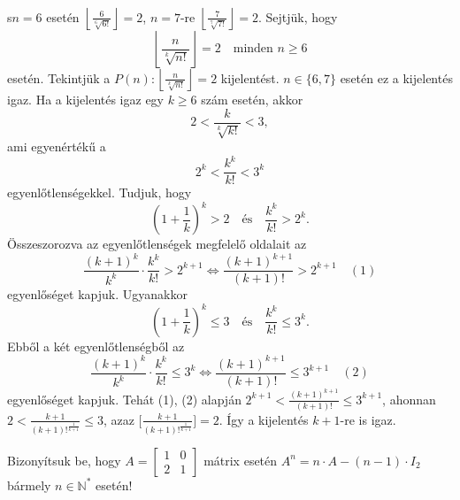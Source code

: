 \begin{solution}
s$n=6$ esetén $\left\lfloor \frac{6}{\sqrt[6]{6!}}\right\rfloor =2$,
\quad{}$n=7$-re $\left\lfloor \frac{7}{\sqrt[7]{7!}}\right\rfloor =2$.
Sejtjük, hogy 
\[
\left\lfloor \frac{n}{\sqrt[k]{n!}}\right\rfloor =2\quad\text{minden }n\geq6
\]
esetén. Tekintjük a $P(n):\left\lfloor \frac{n}{\sqrt[k]{n!}}\right\rfloor =2$
kijelentést. $n\in\{6,7\}$ esetén ez a kijelentés igaz. Ha a kijelentés
igaz egy $k\geq6$ szám esetén, akkor 
\[
2<\frac{k}{\sqrt[k]{k!}}<3,
\]
ami egyenértékű a 
\[
2^{k}<\frac{k^{k}}{k!}<3^{k}
\]
egyenlőtlenségekkel. Tudjuk, hogy 
\[
\left(1+\frac{1}{k}\right)^{k}>2\quad\text{és}\quad\frac{k^{k}}{k!}>2^{k}.
\]
Összeszorozva az egyenlőtlenségek megfelelő oldalait az 
\[
\frac{(k+1)^{k}}{k^{k}}\cdot\frac{k^{k}}{k!}>2^{k+1}\iff\frac{(k+1)^{k+1}}{(k+1)!}>2^{k+1}\quad(1)
\]
egyenlőséget kapjuk. Ugyanakkor 
\[
\left(1+\frac{1}{k}\right)^{k}\leq3\quad\text{és}\quad\frac{k^{k}}{k!}\leq3^{k}.
\]
Ebből a két egyenlőtlenségből az 
\[
\frac{(k+1)^{k}}{k^{k}}\cdot\frac{k^{k}}{k!}\leq3^{k}\iff\frac{(k+1)^{k+1}}{(k+1)!}\leq3^{k+1}\quad(2)
\]
egyenlőséget kapjuk. Tehát (1), (2) alapján $2^{k+1}<\frac{(k+1)^{k+1}}{(k+1)!}\leq3^{k+1}$,
ahonnan $2<\frac{k+1}{(k+1)!^{\frac{1}{k+1}}}\leq3$, azaz $\Bigg[{\displaystyle {\frac{k+1}{(k+1)!^{\frac{1}{k+1}}}}\Bigg]=2}$.
Így a kijelentés $k+1$-re is igaz.
\end{solution}
\begin{extraproblem}
Bizonyítsuk be, hogy $A=\begin{bmatrix}1 & 0\\
2 & 1
\end{bmatrix}$ mátrix esetén $A^{n}=n\cdot A-(n-1)\cdot I_{2}$ bármely $n\in\mathbb{N}^{*}$
esetén! 
\end{extraproblem}


